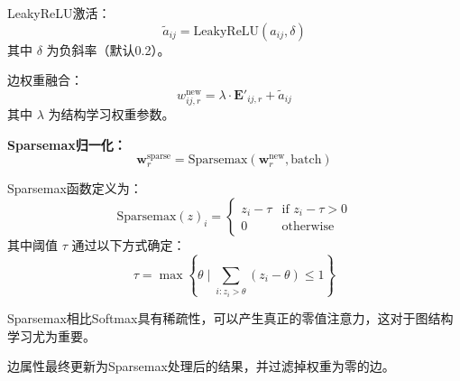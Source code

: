 \documentclass[UTF8, a4paper, 12pt]{article}
\begin{document}
LeakyReLU激活：
\begin{equation}
\tilde{a}_{ij} = \text{LeakyReLU}(a_{ij}, \delta)
\end{equation}
其中 $\delta$ 为负斜率（默认0.2）。

边权重融合：
\begin{equation}
w_{ij,r}^{\text{new}} = \lambda \cdot \mathbf{E}'_{ij,r} + \tilde{a}_{ij}
\end{equation}
其中 $\lambda$ 为结构学习权重参数。

\textbf{Sparsemax归一化：}
\begin{equation}
\mathbf{w}^{\text{sparse}}_r = \text{Sparsemax}(\mathbf{w}^{\text{new}}_r, \text{batch})
\end{equation}

Sparsemax函数定义为：
\begin{equation}
\text{Sparsemax}(z)_i = \begin{cases}
z_i - \tau & \text{if } z_i - \tau > 0 \\
0 & \text{otherwise}
\end{cases}
\end{equation}
其中阈值 $\tau$ 通过以下方式确定：
\begin{equation}
\tau = \max \left\{ \theta \mid \sum_{i: z_i > \theta} (z_i - \theta) \leq 1 \right\}
\end{equation}

Sparsemax相比Softmax具有稀疏性，可以产生真正的零值注意力，这对于图结构学习尤为重要。

边属性最终更新为Sparsemax处理后的结果，并过滤掉权重为零的边。
\end{document}
